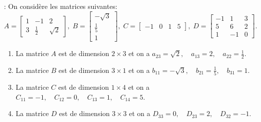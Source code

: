 \documentclass[12pt,a4paper]{book}
\numberwithin{definition}{chapter}
\theoremstyle{plain}
\begin{document}
\begin{example}:
 On considère les matrices suivantes:
 \begin{equation*}
 A=
 \begin{bmatrix}
 1 & -1 & 2\\
 3 &  \frac{1}{2} & \sqrt{2}
 \end{bmatrix},\;
 B=
 \begin{bmatrix}
 -\sqrt{3} \\
 \frac{1}{5}\\
 1
 \end{bmatrix},\;
 C=
 \begin{bmatrix}
 -1 & 0 & 1 & 5
 \end{bmatrix},\;
 D=
 \begin{bmatrix}
 -1 & 1 & 3 \\
 5 & 6 & 2 \\
 1 & -1 & 0
 \end{bmatrix}.
 \end{equation*}
 \begin{enumerate}
 \item La matrice $A$ est de dimension $2\times 3$ et on a $a_{23}=\sqrt{2},\quad a_{13}=2,\quad a_{22}=\frac{1}{2}$.
 \item La matrice $B$ est de dimension $3\times 1$ et on a $b_{11}=-\sqrt{3},\quad b_{21}=\frac{1}{5},\quad b_{31}=1$.
 \item La matrice $C$ est de dimension $1\times 4$ et on a $C_{11}=-1,\quad C_{12}=0,\quad C_{13}=1,\quad C_{14}=5$. 
 \item La matrice $D$ est de dimension $3\times 3$ et on a $D_{33}=0,\quad D_{23}=2,\quad D_{32}=-1$. 
 \end{enumerate} 
\end{example}
\end{document}
